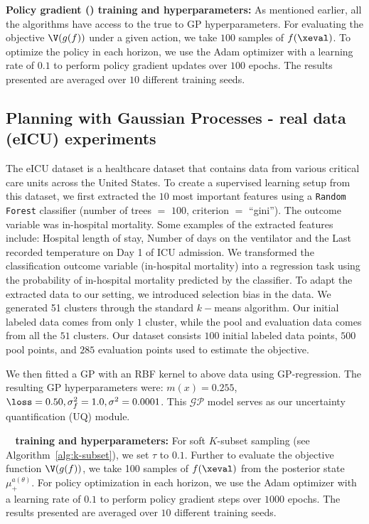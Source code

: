 \noindent\textbf{Policy gradient (\rein) training and hyperparameters:} As mentioned earlier, all the algorithms have access to the true to {GP} hyperparameters. For evaluating the objective $\V (g(f))$ under a given action,  we take $100$ samples of $f(\xeval)$.  To optimize the policy in each horizon, we use the Adam optimizer with a learning rate of $0.1$ to perform policy gradient updates over $100$ epochs. The results presented are averaged over $10$ different training seeds.


\subsection{Planning with Gaussian Processes - real data (eICU) experiments}


The eICU  dataset is a healthcare dataset that contains data from various critical care units across the United States. To create a supervised learning setup from this dataset, we first extracted the $10$ most important features using a \texttt{Random Forest} classifier (number of trees $=$ $100$, criterion $=$ ``gini'').  The outcome variable was in-hospital mortality. Some examples of the extracted features include: Hospital length of stay, Number of days on the ventilator and the Last recorded temperature on Day 1 of ICU admission. We transformed the classification outcome variable (in-hospital mortality) into a regression task using the probability of in-hospital mortality predicted by the classifier.
To adapt the extracted data to our setting, we introduced selection bias in the data. We generated 51 clusters through the standard $k-$means algorithm. Our initial labeled data comes from only $1$ cluster, while the pool and evaluation data comes from all the $51$ clusters. Our dataset consists $100$ initial labeled data points, $500$ pool points, and $285$ evaluation points used to estimate the objective. 


We then fitted a  {GP}  with an RBF kernel to above data using  {GP}-regression. The resulting {GP} hyperparameters were: $m(x)=0.255$, $\loss = 0.50, \sigma_f^2 = 1.0, \sigma^2 =0.0001$. This $\mathcal{GP}$ model serves as our uncertainty quantification (UQ) module.


\noindent\textbf{\ouralgo  ~ training and hyperparameters:} For soft $K$-subset sampling  (see Algorithm~\ref{alg:k-subset}),  we set $\tau$ to $0.1$. Further to evaluate the objective function $\V (g(f))$, we take 100 samples of $f(\xeval)$ from the posterior state $\mu_+^{a(\theta)}$.
For policy optimization in each horizon, we use the Adam optimizer with a learning rate of $0.1$ to perform policy gradient steps over $1000$ epochs. The results presented are averaged over $10$ different training seeds.


